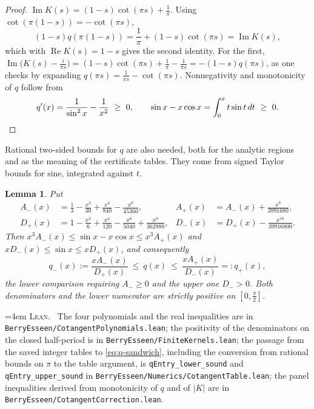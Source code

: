 \documentclass[10pt,a4paper]{article}
\theoremstyle{plain}
\newtheorem{lemma}[theorem]{Lemma}
\theoremstyle{definition}
\newcommand{\lean}[1]{\texttt{#1}}
\newcommand{\file}[1]{\texttt{#1}}
\DeclareMathOperator{\Rea}{Re}
\DeclareMathOperator{\Ima}{Im}
\newenvironment{leanref}%
  {\par\addvspace{3pt}\begingroup\sloppy\emergencystretch=4em
   \noindent\footnotesize\textsc{Lean.}\ \ignorespaces}%
  {\par\endgroup\addvspace{3pt}}
\begin{document}
\begin{proof}
$\Ima K(s)=(1-s)\cot(\pi s)+\tfrac1\pi$. Using
$\cot(\pi(1-s))=-\cot(\pi s)$,
\[
  (1-s)q(\pi(1-s)) = \frac1\pi+(1-s)\cot(\pi s) = \Ima K(s),
\]
which with $\Rea K(s)=1-s$ gives the second identity. For the first,
$\Ima\bigl(K(s)-\tfrac{i}{\pi s}\bigr)
=(1-s)\cot(\pi s)+\tfrac1\pi-\tfrac1{\pi s}=-(1-s)q(\pi s)$, as one checks by
expanding $q(\pi s)=\tfrac1{\pi s}-\cot(\pi s)$.
Nonnegativity and monotonicity of $q$ follow from
\[
  q'(x) = \frac1{\sin^2x}-\frac1{x^2}\ \ge\ 0,
  \qquad
  \sin x - x\cos x = \int_0^x t\sin t\,dt \ \ge\ 0 . \qedhere
\]
\end{proof}

Rational two-sided bounds for $q$ are also needed, both for the analytic
regions and as the meaning of the certificate tables. They come from signed
Taylor bounds for sine, integrated against $t$.

\begin{lemma}\label{lem:q-rational}
Put
\begin{align*}
  A_-(x) &= \tfrac13-\tfrac{x^2}{30}+\tfrac{x^4}{840}-\tfrac{x^6}{45360},
  & A_+(x) &= A_-(x)+\tfrac{x^8}{3991680},\\
  D_+(x) &= 1-\tfrac{x^2}{6}+\tfrac{x^4}{120}-\tfrac{x^6}{5040}
            +\tfrac{x^8}{362880},
  & D_-(x) &= D_+(x)-\tfrac{x^{10}}{39916800}.
\end{align*}
Then $x^3A_-(x)\le\sin x-x\cos x\le x^3A_+(x)$ and
$xD_-(x)\le\sin x\le xD_+(x)$, and consequently
\begin{equation}\label{eq:q-sandwich}
  q_-(x) := \frac{xA_-(x)}{D_+(x)} \ \le\ q(x) \ \le\
  \frac{xA_+(x)}{D_-(x)} =: q_+(x),
\end{equation}
the lower comparison requiring $A_-\ge0$ and the upper one $D_->0$. Both
denominators and the lower numerator are strictly positive on $[0,\tfrac\pi2]$.
\end{lemma}

\begin{leanref}
The four polynomials and the real inequalities are in
\file{BerryEsseen/CotangentPolynomials.lean}; the positivity of the
denominators on the closed half-period is in
\file{BerryEsseen/FiniteKernels.lean}; the passage from the saved integer
tables to \eqref{eq:q-sandwich}, including the conversion from rational bounds
on $\pi$ to the table argument, is \lean{qEntry\_lower\_sound} and
\lean{qEntry\_upper\_sound} in \file{BerryEsseen/Numerics/CotangentTable.lean};
the panel inequalities derived from monotonicity of $q$ and of $|K|$ are in
\file{BerryEsseen/CotangentCorrection.lean}.
\end{leanref}
\end{document}
